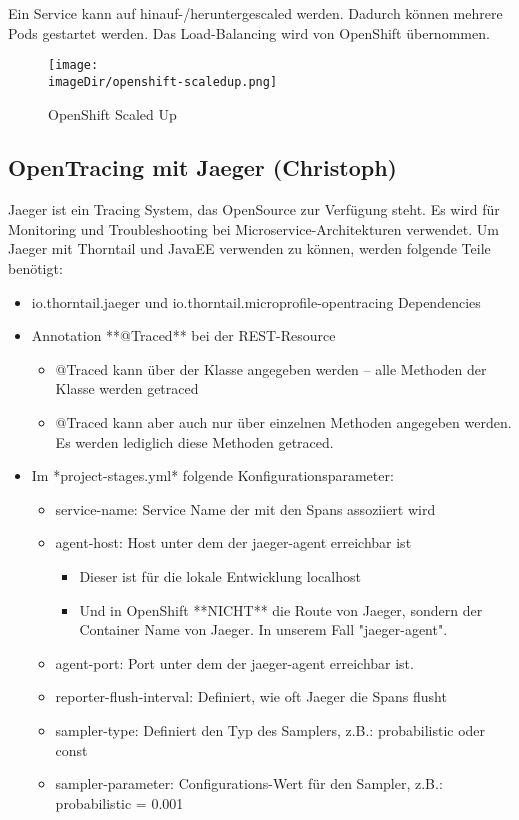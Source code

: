 \documentclass[11pt, a4paper, twoside]{article}   	%
\newcommand{\imageDir}{../../images}
\begin{document}
Ein Service kann auf hinauf-/heruntergescaled werden. Dadurch können mehrere Pods gestartet werden. Das Load-Balancing wird von OpenShift übernommen.
\begin{figure}[h]
	\centering
	\texttt{[image: \\imageDir/openshift-scaledup.png]}
	\caption{OpenShift Scaled Up}
\end{figure}

\newpage
\subsection{OpenTracing mit Jaeger (Christoph)}
Jaeger ist ein Tracing System, das OpenSource zur Verfügung steht. Es wird für Monitoring und Troubleshooting bei Microservice-Architekturen verwendet.
Um Jaeger mit Thorntail und JavaEE verwenden zu können, werden folgende Teile benötigt:
\begin{itemize}
	\item io.thorntail.jaeger und io.thorntail.microprofile-opentracing Dependencies
	\item Annotation **@Traced** bei der REST-Resource
	\begin{itemize}
		\item @Traced kann über der Klasse angegeben werden -- alle Methoden der Klasse werden getraced
		\item @Traced kann aber auch nur über einzelnen Methoden angegeben werden. Es werden lediglich diese Methoden getraced.
	\end{itemize}
	\item Im *project-stages.yml* folgende Konfigurationsparameter:
	\begin{itemize}
		\item service-name: Service Name der mit den Spans assoziiert wird
		\item agent-host: Host unter dem der jaeger-agent erreichbar ist
		\begin{itemize}
			\item Dieser ist für die lokale Entwicklung localhost
			\item Und in OpenShift **NICHT** die Route von Jaeger, sondern der Container Name von Jaeger. In unserem Fall "jaeger-agent".
		\end{itemize}
		\item agent-port: Port unter dem der jaeger-agent erreichbar ist.
		\item reporter-flush-interval: Definiert, wie oft Jaeger die Spans flusht
		\item sampler-type: Definiert den Typ des Samplers, z.B.: probabilistic oder const
		\item sampler-parameter: Configurations-Wert für den Sampler, z.B.: probabilistic = 0.001
	\end{itemize}
\end{itemize}
\end{document}
